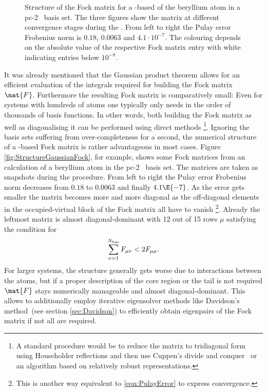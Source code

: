 \begin{figure}
	\centering
	\caption[Structure of the Fock matrix for a \cGTO-based \SCF]
		{Structure of the Fock matrix for a \cGTO-based \SCF
		of the beryllium atom
		in a pc-2~\cite{Jensen2007} basis set.
		The three figures show the matrix
		at different convergence stages during the \SCF.
		From left to right the Pulay error
		Frobenius norm is $0.18$, $0.0063$ and $4.1 \cdot 10^{-7}$.
		The colouring depends on the absolute value
		of the respective Fock matrix entry
		with white indicating entries below $10^{-8}$.
	}
	\label{fig:StructureGaussianFock}
\end{figure}
It was already mentioned that the Gaussian product theorem
allows for an efficient evaluation of the integrals
required for building the Fock matrix $\mat{F}$.
Furthermore the resulting Fock matrix is comparatively small:
Even for systems with hundreds of atoms one typically only needs
in the order of thousands of basis functions.
In other words, both building the Fock matrix
as well as diagonalising it can be performed using direct methods%
\noindent
\footnote{%
	A standard procedure would be to reduce the matrix to
	tridiagonal form using Householder reflections
	and then use Cuppen's divide and conquer~\cite{Arbenz2010}
	or an algorithm based on relatively robust representations.
}.
Ignoring the basis sets suffering from over-completeness for a second,
the numerical structure of a \cGTO-based Fock matrix
is rather advantageous in most cases.
Figure \vref{fig:StructureGaussianFock}, for example,
shows some Fock matrices from an \SCF calculation
of a beryllium atom
in the pc-2~\cite{Jensen2007} basis set.
The matrices are taken as snapshots during the \SCF procedure.
From left to right the Pulay error Frobenius norm decreases
from $0.18$ to $0.0063$ and finally $4.1\E{-7}$.
As the error gets smaller the matrix becomes more and more diagonal
as the off-diagonal elements in the occupied-virtual block of the
Fock matrix all have to vanish%
\footnote{This is another way equivalent to \eqref{eqn:PulayError}
to express \SCF convergence.}.
Already the leftmost matrix is almost diagonal-dominant with 12
out of 15 rows $\mu$
satisfying the condition for 
\[
	\sum_{\nu=1}^{N_\text{bas}} F_{\mu\nu} < 2 F_{\mu\mu}.
\]
For larger systems, the structure generally gets
worse due to interactions between the atoms,
but if a proper description of the core region or the tail is not required
$\mat{F}$ stays numerically manageable and almost diagonal-dominant.
This allows to additionally employ
iterative eigensolver methods like Davidson's method~(see section \vref{sec:Davidson})
to efficiently obtain eigenpairs of the Fock matrix if not all are required.

